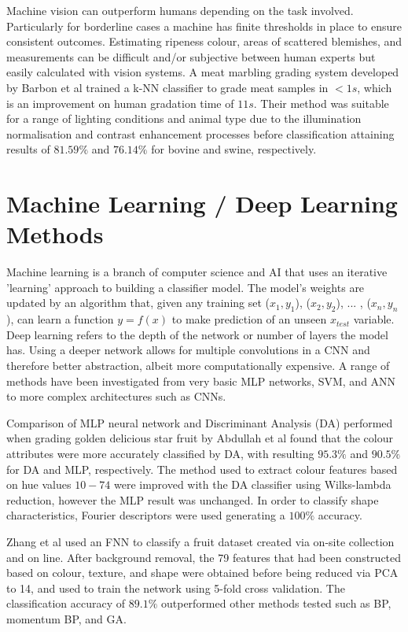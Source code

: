 \documentclass[fleqn,twoside,12pt]{report}
\begin{document}
Machine vision can outperform humans depending on the task involved. Particularly for borderline cases a machine has finite thresholds in place to ensure consistent outcomes. Estimating ripeness colour, areas of scattered blemishes, and measurements can be difficult and/or subjective between human experts but easily calculated with vision systems. A meat marbling grading system developed by Barbon et al \cite{barbon} trained a k-NN classifier to grade meat samples in $<1s$, which is an improvement on human gradation time of $11s$. Their method was suitable for a range of lighting conditions and animal type due to the illumination normalisation and contrast enhancement processes before classification attaining results of $81.59\%$ and $76.14\%$ for bovine and swine, respectively. 



\section{Machine Learning / Deep Learning Methods}


Machine learning is a branch of computer science and AI that uses an iterative 'learning' approach to building a classifier model. The model's weights are updated by an algorithm that, given any training set ($x_1, y_1$), ($x_2, y_2$), ... , ($x_n, y_n$), can learn a function $y = f(x)$ to make prediction of an unseen $x_{test}$ variable. Deep learning refers to the depth of the network or number of layers the model has. Using a deeper network allows for multiple convolutions in a CNN and therefore better abstraction, albeit more computationally expensive. A range of methods have been investigated from very basic MLP networks, SVM, and ANN to more complex architectures such as CNNs.


Comparison of MLP neural network and Discriminant Analysis (DA) performed when grading golden delicious star fruit by Abdullah et al \cite{abdullah} found that the colour attributes were more accurately classified by DA, with resulting $95.3\%$ and $90.5\%$ for DA and MLP, respectively. The method used to extract colour features based on hue values $10-74$ were improved with the DA classifier using Wilks-lambda reduction, however the MLP result was unchanged. In order to classify shape characteristics, Fourier descriptors were used generating a $100\%$ accuracy.


Zhang et al \cite{zhang} used an FNN to classify a fruit dataset created via on-site collection and on line. After background removal, the 79 features that had been constructed based on colour, texture, and shape were obtained before being reduced via PCA to 14, and used to train the network using 5-fold cross validation. The classification accuracy of $89.1\%$ outperformed other methods tested such as BP, momentum BP, and GA. 
\end{document}
